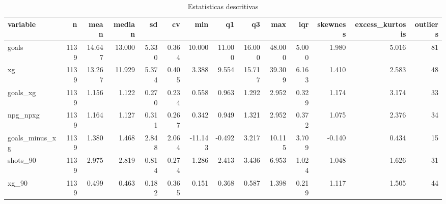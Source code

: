 \begin{table}

\caption{\label{tab:desc_g10}Estatisticas descritivas}
\centering
\begin{tabular}[t]{lrrrrrrrrrrrrr}
\toprule
variable & n & mean & median & sd & cv & min & q1 & q3 & max & iqr & skewness & excess\_kurtosis & outliers\\
\midrule
goals & 1139 & 14.647 & 13.000 & 5.330 & 0.364 & 10.000 & 11.000 & 16.000 & 48.000 & 5.000 & 1.980 & 5.016 & 81\\
xg & 1139 & 13.267 & 11.929 & 5.374 & 0.405 & 3.388 & 9.554 & 15.717 & 39.309 & 6.163 & 1.410 & 2.583 & 48\\
goals\_xg & 1139 & 1.156 & 1.122 & 0.270 & 0.234 & 0.558 & 0.963 & 1.292 & 2.952 & 0.329 & 1.174 & 3.174 & 33\\
npg\_npxg & 1139 & 1.164 & 1.127 & 0.311 & 0.267 & 0.342 & 0.949 & 1.321 & 2.952 & 0.372 & 1.075 & 2.376 & 34\\
goals\_minus\_xg & 1139 & 1.380 & 1.468 & 2.848 & 2.064 & -11.143 & -0.492 & 3.217 & 10.115 & 3.709 & -0.140 & 0.434 & 15\\
\addlinespace
shots\_90 & 1139 & 2.975 & 2.819 & 0.814 & 0.274 & 1.286 & 2.413 & 3.436 & 6.953 & 1.024 & 1.048 & 1.626 & 31\\
xg\_90 & 1139 & 0.499 & 0.463 & 0.182 & 0.365 & 0.151 & 0.368 & 0.587 & 1.398 & 0.219 & 1.117 & 1.505 & 44\\
\bottomrule
\end{tabular}
\end{table}

